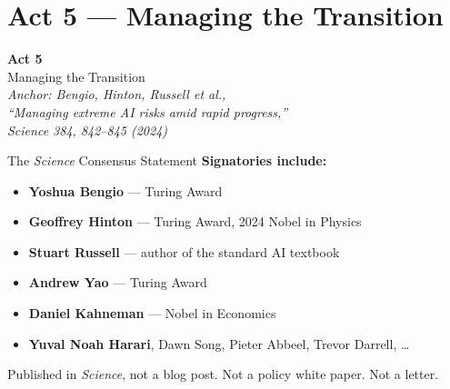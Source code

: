 \documentclass[aspectratio=169, 12pt, xcolor={dvipsnames,table}]{beamer}
\newcommand{\sourcemark}[1]{\hfill{\tiny\color{gray}#1}}
\begin{document}
\section{Act 5 --- Managing the Transition}

\begin{frame}[plain]
\begin{center}
  {\Huge\bfseries Act 5}\\[0.4em]
  {\large Managing the Transition}\\[1.5em]
  {\footnotesize\itshape Anchor: Bengio, Hinton, Russell et al.,\\
   ``Managing extreme AI risks amid rapid progress,''\\
   \emph{Science} 384, 842--845 (2024)}
\end{center}
\end{frame}

\begin{frame}{The \emph{Science} Consensus Statement}
\textbf{Signatories include:}
\begin{itemize}
  \item \textbf{Yoshua Bengio} --- Turing Award
  \item \textbf{Geoffrey Hinton} --- Turing Award, 2024 Nobel in Physics
  \item \textbf{Stuart Russell} --- author of the standard AI textbook
  \item \textbf{Andrew Yao} --- Turing Award
  \item \textbf{Daniel Kahneman} --- Nobel in Economics
  \item \textbf{Yuval Noah Harari}, Dawn Song, Pieter Abbeel, Trevor Darrell, \ldots
\end{itemize}
\vspace{0.3em}
Published in \emph{Science}, not a blog post. Not a policy white paper. Not a letter.
\sourcemark{\citealp{bengio2024managing}}
\end{frame}
\end{document}
